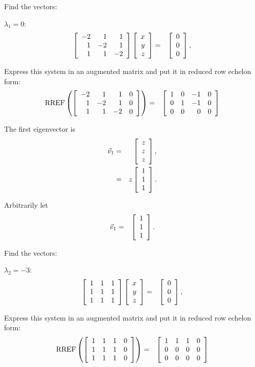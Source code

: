 \begin{frame}
  Find the vectors:

  $\lambda_1 = 0$:
  \begin{eqnarray*}
    \left[ \begin{array}{rrr} -2 & 1 & 1 \\ 1 & -2 & 1 \\ 1 & 1 & -2 \end{array} \right]\left[ \begin{array}{r} x \\ y \\ z \end{array} \right] & = & \left[ \begin{array}{r} 0 \\ 0 \\ 0 \end{array} \right], \\
  \end{eqnarray*}

  Express this system in an augmented matrix and put it in reduced row
  echelon form:
  \begin{eqnarray*}
    \mathrm{RREF}\left(\left[ \begin{array}{rrrr}
    -2 & 1 & 1 & 0 \\  
    1 & -2 & 1 & 0 \\ 
    1 & 1 & -2 & 0 \\ 
    \end{array} \right]
    \right)
    & = & 
    \left[ \begin{array}{rrrr}
    1 & 0 & -1 & 0 \\  
    0 & 1 & -1 & 0 \\ 
    0 & 0 & 0 & 0 \\ 
    \end{array} \right]
  \end{eqnarray*}


\end{frame}

\begin{frame}
  The first eigenvector is 
  \begin{eqnarray*}
    \vec{v}_1 & = & \left[ \begin{array}{r} z \\ z \\ z \end{array} \right], \\
    & = & z \left[ \begin{array}{r} 1 \\ 1 \\ 1 \end{array} \right].
  \end{eqnarray*}

  Arbitrarily let
  \begin{eqnarray*}
    \vec{v}_1 & = & \left[ \begin{array}{r} 1 \\ 1 \\ 1 \end{array} \right].
  \end{eqnarray*}

\end{frame}

\begin{frame}
  Find the vectors:

  $\lambda_2 = -3$:
  \begin{eqnarray*}
    \left[ \begin{array}{rrr} 1 & 1 & 1 \\ 1 & 1 & 1 \\ 1 & 1 & 1 \end{array} \right]
    \left[ \begin{array}{r} x \\ y \\ z \end{array} \right] & = & \left[ \begin{array}{r} 0 \\ 0 \\ 0 \end{array} \right], \\
  \end{eqnarray*}

  Express this system in an augmented matrix and put it in reduced row
  echelon form:
  \begin{eqnarray*}
    \mathrm{RREF}\left(\left[ \begin{array}{rrrr}
    1 & 1 & 1 & 0 \\  
    1 & 1 & 1 & 0 \\ 
    1 & 1 & 1 & 0 \\ 
    \end{array} \right]
  \right)
    & = & 
    \left[ \begin{array}{rrrr}
    1 & 1 & 1 & 0 \\  
    0 & 0 & 0 & 0 \\ 
    0 & 0 & 0 & 0 \\ 
    \end{array} \right]
  \end{eqnarray*}

\end{frame}

